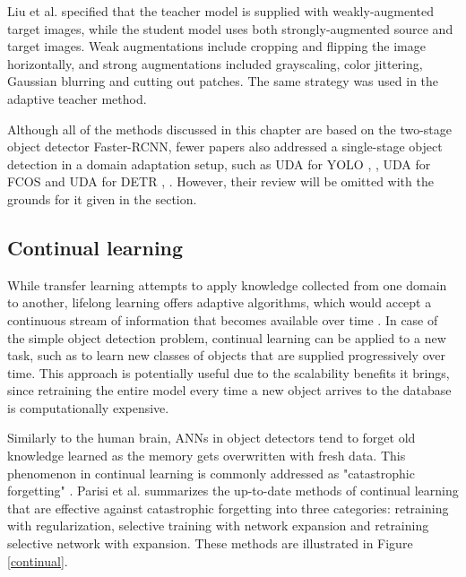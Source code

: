 \documentclass[english, 12pt, a4paper, elec, utf8, a-1b, online]{aaltothesis}
\begin{document}
Liu et al.\cite{Liu2021} specified that the teacher model is supplied with weakly-augmented target images, while the student model uses both strongly-augmented source and target images. Weak augmentations include cropping and flipping the image horizontally, and strong augmentations included grayscaling, color jittering, Gaussian blurring and cutting out patches. The same strategy was used in the adaptive teacher method. 

Although all of the methods discussed in this chapter are based on the two-stage object detector Faster-RCNN, fewer papers also addressed a single-stage object detection in a domain adaptation setup, such as UDA for YOLO \cite{Hnewa2021}, \cite{Zhang2021a}, UDA for FCOS \cite{fcos1} and UDA for DETR \cite{Zhang2021b}, \cite{Vidit2021}. However, their review will be omitted with the grounds for it given in the  section. 

\subsection{Continual learning}
\label{cont_learning} 
While transfer learning attempts to apply knowledge collected from one domain to another, lifelong learning offers adaptive algorithms, which  would accept a continuous stream of information that becomes available over time \cite{Parisi2018}. In case of the simple object detection problem, continual learning can be applied to a new task, such as to learn new classes of objects that are supplied progressively over time. This approach is potentially useful due to the scalability benefits it brings, since retraining the entire model every time a new object arrives to the database is computationally expensive. 

Similarly to the human brain, ANNs in object detectors tend to forget old knowledge learned as the memory gets overwritten with fresh data. This phenomenon in continual learning is commonly addressed as "catastrophic forgetting" \cite{Parisi2018}. Parisi et al. summarizes the up-to-date methods of continual learning that are effective against catastrophic forgetting into three categories: retraining with regularization, selective training with network expansion and retraining selective network with expansion. These methods are illustrated in Figure \ref{continual}. 
\end{document}
